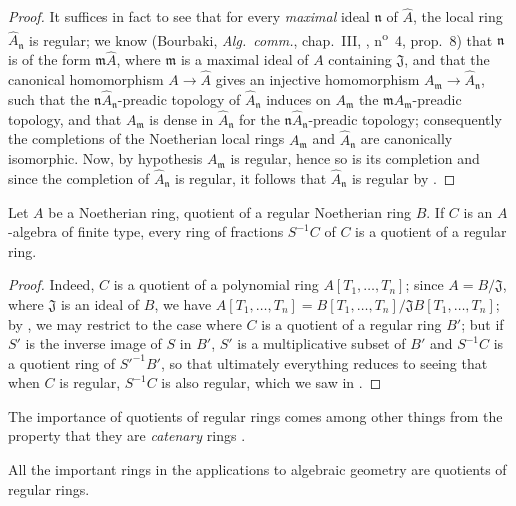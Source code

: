 \begin{proof}
It suffices in fact  to see that for every \emph{maximal} ideal $\mathfrak{n}$ of $\widehat{A}$, the local ring $\widehat{A}_\mathfrak{n}$ is regular;
  we know (Bourbaki, \emph{Alg.~comm.}, chap.~III, , n\textsuperscript{o}~4, prop.~8) that $\mathfrak{n}$
is of the form $\mathfrak{m}\widehat{A}$, where $\mathfrak{m}$ is a maximal ideal of $A$ containing $\mathfrak{J}$, and that the canonical homomorphism $A\to\widehat{A}$ gives an injective homomorphism $A_\mathfrak{m}\to\widehat{A}_\mathfrak{n}$, such that the $\mathfrak{n}\widehat{A}_\mathfrak{n}$-preadic topology of $\widehat{A}_\mathfrak{n}$ induces on $A_\mathfrak{m}$ the $\mathfrak{m}A_\mathfrak{m}$-preadic topology, and that $A_\mathfrak{m}$ is dense in $\widehat{A}_\mathfrak{n}$ for the $\mathfrak{n}\widehat{A}_\mathfrak{n}$-preadic topology;
consequently the completions of the Noetherian local rings $A_\mathfrak{m}$ and $\widehat{A}_\mathfrak{n}$ are canonically isomorphic.
Now, by hypothesis $A_\mathfrak{m}$ is regular, hence so is its completion  and since the completion of $\widehat{A}_\mathfrak{n}$ is regular, it follows that $\widehat{A}_\mathfrak{n}$ is regular by .
\end{proof}

\begin{corollary}[17.3.9]
\label{0.17.3.9}
Let $A$ be a Noetherian ring, quotient of a regular Noetherian ring $B$.
If $C$ is an $A$-algebra of finite type, every ring of fractions $S^{-1}C$ of $C$ is a quotient of a regular ring.
\end{corollary}

\begin{proof}
Indeed, $C$ is a quotient of a polynomial ring $A[T_1,\ldots,T_n]$;
since $A=B/\mathfrak{J}$, where $\mathfrak{J}$ is an ideal of $B$, we have $A[T_1,\ldots,T_n]=B[T_1,\ldots,T_n]/\mathfrak{J}B[T_1,\ldots,T_n]$;
by , we may restrict to the case where $C$ is a quotient of a regular ring $B'$;
but if $S'$ is the inverse image of $S$ in $B'$, $S'$ is a multiplicative subset of $B'$ and $S^{-1}C$ is a quotient ring of $S'^{-1}B'$, so that ultimately everything reduces to seeing that when $C$ is regular, $S^{-1}C$ is also regular, which we saw in .
\end{proof}

The importance of quotients of regular rings comes among other things from the property that they are \emph{catenary} rings .

All the important rings in the applications to algebraic geometry are quotients of regular rings.
